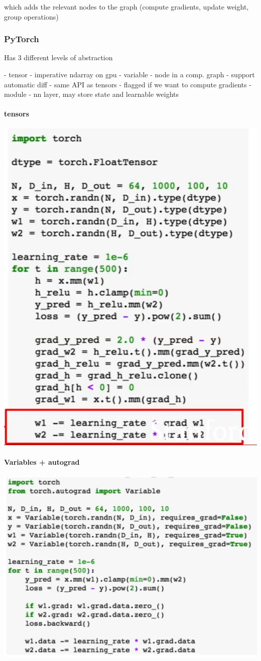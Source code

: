 which adds the relevant nodes to the graph (compute gradients, update weight, group operations)

\subsubsection{PyTorch}

Has 3 different levels of abstraction

- tensor - imperative ndarray on gpu
- variable - node in a comp. graph
  - support automatic diff
  - same API as tensors
  - flagged if we want to compute gradients
- module - nn layer, may store state and learnable weights



\paragraph{tensors}

\includegraphics[width=0.5\columnwidth]{fei_fei_li/lecture_08/pytorch_tensors.png}

\paragraph{Variables + autograd}

\includegraphics[width=0.5\columnwidth]{fei_fei_li/lecture_08/pytoch_variable.png}

